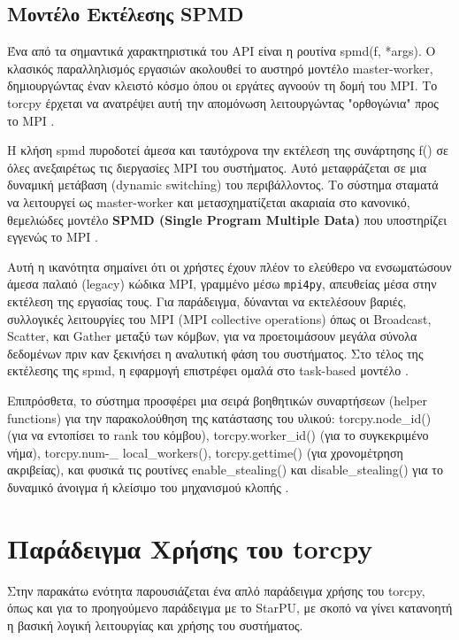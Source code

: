 \subsection{Μοντέλο Εκτέλεσης SPMD}

Ένα από τα σημαντικά χαρακτηριστικά του API είναι η ρουτίνα spmd(f, *args). Ο κλασικός παραλληλισμός εργασιών ακολουθεί το αυστηρό μοντέλο master-worker, δημιουργώντας έναν κλειστό κόσμο όπου οι εργάτες αγνοούν τη δομή του MPI. Το torcpy έρχεται να ανατρέψει αυτή την απομόνωση λειτουργώντας "ορθογώνια" προς το MPI \cite{hadjidoukas2020torcpy}.

Η κλήση spmd πυροδοτεί άμεσα και ταυτόχρονα την εκτέλεση της συνάρτησης f() σε όλες ανεξαιρέτως τις διεργασίες MPI του συστήματος. Αυτό μεταφράζεται σε μια δυναμική μετάβαση (dynamic switching) του περιβάλλοντος. Το σύστημα σταματά να λειτουργεί ως master-worker και μετασχηματίζεται ακαριαία στο κανονικό, θεμελιώδες μοντέλο \textbf{SPMD (Single Program Multiple Data)} που υποστηρίζει εγγενώς το MPI \cite{hadjidoukas2020torcpy}.

Αυτή η ικανότητα σημαίνει ότι οι χρήστες έχουν πλέον το ελεύθερο να ενσωματώσουν άμεσα παλαιό (legacy) κώδικα MPI, γραμμένο μέσω \texttt{mpi4py}, απευθείας μέσα στην εκτέλεση της εργασίας τους. Για παράδειγμα, δύνανται να εκτελέσουν βαριές, συλλογικές λειτουργίες του MPI (MPI collective operations) όπως οι Broadcast, Scatter, και Gather μεταξύ των κόμβων, για να προετοιμάσουν μεγάλα σύνολα δεδομένων πριν καν ξεκινήσει η αναλυτική φάση του συστήματος. Στο τέλος της εκτέλεσης της spmd, η εφαρμογή επιστρέφει ομαλά στο task-based μοντέλο \cite{hadjidoukas2020torcpy}.

Επιπρόσθετα, το σύστημα προσφέρει μια σειρά βοηθητικών συναρτήσεων (helper functions) για την παρακολούθηση της κατάστασης του υλικού: torcpy.node\_id() (για να εντοπίσει το rank του κόμβου), torcpy.worker\_id() (για το συγκεκριμένο νήμα), torcpy.num-\linebreak\_ local\_workers(), torcpy.gettime() (για χρονομέτρηση ακριβείας), και φυσικά τις ρουτίνες enable\_stealing() και disable\_stealing() για το δυναμικό άνοιγμα ή κλείσιμο του μηχανισμού κλοπής \cite{ibm_torcpy}.

\section{Παράδειγμα Χρήσης του torcpy}

Στην παρακάτω ενότητα παρουσιάζεται ένα απλό παράδειγμα χρήσης του torcpy, όπως και για το προηγούμενο παράδειγμα με το StarPU, με σκοπό να γίνει κατανοητή η βασική λογική λειτουργίας και χρήσης του συστήματος. 

